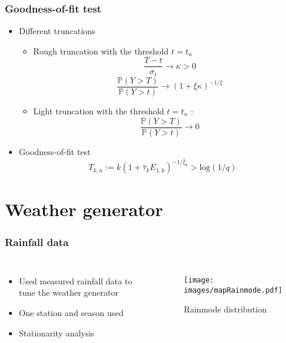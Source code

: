 \documentclass{beamer}
\begin{document}
\begin{frame}
\frametitle{Goodness-of-fit test}
\begin{itemize}
	\item Different truncations
	\begin{itemize}
		\item Rough truncation with the threshold $t = t_n$
			\begin{equation*}
			\frac{T - t}{\sigma_t} \rightarrow \kappa > 0
			\label{RoughTru}
			\end{equation*}
			\begin{equation*}
			\frac{\mathbb{P}(Y > T)}{\mathbb{P}(Y > t)} \rightarrow (1+ \xi \kappa)^{-1/\xi}
			\end{equation*}
		\item Light truncation with the threshold $t= t_n$ :
		\begin{equation*}
		\frac{\mathbb{P} (Y > T)}{\mathbb{P}(Y>t)} \rightarrow 0
		\label{LightTru}
		\end{equation*}	
	\end{itemize}
	\item Goodness-of-fit test
	\begin{equation*}
	T_{k,n} := k(1 + \hat{\tau}_k E_{1,k})^{-1/\hat{\xi}_k} > \text{log}(1/q)
	\label{gofTest}
	\end{equation*}
\end{itemize}
\end{frame}

\section{Weather generator}

\begin{frame}
\frametitle{Rainfall data}
\begin{columns}
	\begin{itemize}
		\item Used measured rainfall data to tune the weather generator
		\item One station and season used 
		\item Stationarity analysis
	\end{itemize}
	\begin{figure}
		\texttt{[image: images/mapRainmode.pdf]}
		\caption{Rainmode distribution}
	\end{figure}
\end{columns}
\end{frame}
\end{document}
